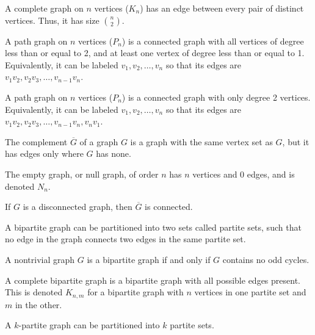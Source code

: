 \documentclass{article}
\begin{document}
\medskip{}

    A complete graph on $n$ vertices ($K_n$) has an edge between every pair of distinct vertices.
    Thus, it has size ${n \choose 2}$.

\medskip{}

    A path graph on $n$ vertices ($P_n$) is a connected graph with all vertices of degree less than or equal to 2, and at least one vertex of degree less than or equal to 1. Equivalently, it can be labeled $v_1, v_2, \hdots, v_n$ so that its edges are $v_1v_2, v_2v_3, \hdots, v_{n-1}v_n$.

\medskip{}

    A path graph on $n$ vertices ($P_n$) is a connected graph with only degree 2 vertices. Equivalently, it can be labeled $v_1, v_2, \hdots, v_n$ so that its edges are $v_1v_2, v_2v_3, \hdots, v_{n-1}v_n, v_nv_1$.

\medskip{}

    The complement $\overline G$ of a graph $G$ is a graph with the same vertex set as $G$, but it has edges only where $G$ has none.

\medskip{}

    The empty graph, or null graph, of order $n$ has $n$ vertices and 0 edges, and is denoted $N_n$.

\medskip{}

    If $G$ is a disconnected graph, then $\overline G$ is connected.

\medskip{}

    A bipartite graph can be partitioned into two sets called partite sets, such that no edge in the graph connects two edges in the same partite set.

\medskip{}

    A nontrivial graph $G$ is a bipartite graph if and only if $G$ contains no odd cycles.

\medskip{}

    A complete bipartite graph is a bipartite graph with all possible edges present. This is denoted $K_{n,m}$ for a bipartite graph with $n$ vertices in one partite set and $m$ in the other.

\medskip{}

    A $k$-partite graph can be partitioned into $k$ partite sets.
\end{document}
